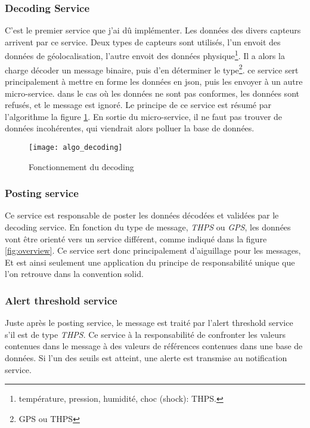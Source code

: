\documentclass[../rapport.tex]{subfiles}
\begin{document}
        \subsubsection{Decoding Service}
        C'est le premier service que j'ai dû implémenter. 
        Les données des divers capteurs arrivent par ce service. Deux types de
        capteurs sont utilisés, l'un envoit des données de géolocalisation,
        l'autre envoit des données physique\footnote{température, pression,
        humidité, choc (shock): THPS.}. Il a alors la charge décoder un message
        binaire, puis d'en déterminer le type\footnote{GPS ou THPS}. ce service
        sert principalement à mettre en forme les données en \gls{json}, puis
        les envoyer à un autre micro-service. dans le cas où les données ne
        sont pas conformes, les données sont refusés, et le message est ignoré.
        Le principe de ce service est résumé par l'algorithme la figure
        \ref{fig:algo_decoding}.
        En sortie du micro-service, il ne faut pas trouver de données
        incohérentes, qui viendrait alors 
        polluer la base de données.

        \begin{figure}
            \centering
            \texttt{[image: algo\_decoding]}
            \caption{Fonctionnement du decoding}\label{fig:algo_decoding}
        \end{figure}

        \subsubsection{Posting service}
        Ce service est responsable de poster les données décodées et validées par le decoding service.
        En fonction du type de message, \textit{THPS} ou \textit{GPS}, les données vont être orienté vers un service différent,
        comme indiqué dans la figure \ref{fig:overview}. Ce service sert donc principalement d'aiguillage pour les messages,
        Et est ainsi seulement une application du principe de responsabilité unique que l'on retrouve dans la convention \gls{solid}.

        \subsubsection{Alert threshold service}
        Juste après le posting service, le message est traité par l'alert threshold service s'il est de type \textit{THPS}.
        Ce service à la responsabilité de confronter les valeurs contenues dans le message à des valeurs de références contenues dans
        une base de données. Si l'un des seuils est atteint, une alerte est transmise au notification service.
\end{document}
